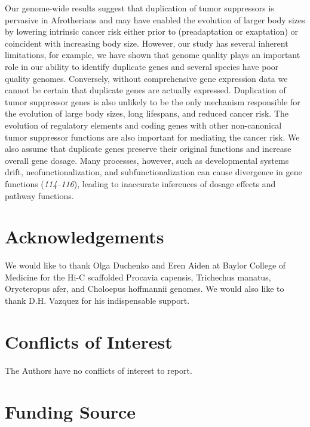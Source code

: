 \documentclass[]{elsarticle} %
\begin{document}
Our genome-wide results suggest that duplication of tumor suppressors is pervasive in Afrotherians and may have enabled the evolution of larger body sizes by lowering intrinsic cancer risk either prior to (preadaptation or exaptation) or coincident with increasing body size. However, our study has several inherent limitations, for example, we have shown that genome quality plays an important role in our ability to identify duplicate genes and several species have poor quality genomes. Conversely, without comprehensive gene expression data we cannot be certain that duplicate genes are actually expressed. Duplication of tumor suppressor genes is also unlikely to be the only mechanism responsible for the evolution of large body sizes, long lifespans, and reduced cancer risk. The evolution of regulatory elements and coding genes with other non-canonical tumor suppressor functions are also important for mediating the cancer risk. We also assume that duplicate genes preserve their original functions and increase overall gene dosage. Many processes, however, such as developmental systems drift, neofunctionalization, and subfunctionalization can cause divergence in gene functions (\emph{114}--\emph{116}), leading to inaccurate inferences of dosage effects and pathway functions.

\hypertarget{acknowledgements}{%
\section{Acknowledgements}\label{acknowledgements}}

We would like to thank Olga Duchenko and Eren Aiden at Baylor College of Medicine for the Hi-C scaffolded Procavia capensis, Trichechus manatus, Orycteropus afer, and Choloepus hoffmannii genomes. We would also like to thank
D.H. Vazquez for his indispensable support.

\hypertarget{conflicts-of-interest}{%
\section{Conflicts of Interest}\label{conflicts-of-interest}}

The Authors have no conflicts of interest to report.

\hypertarget{funding-source}{%
\section{Funding Source}\label{funding-source}}
\end{document}
